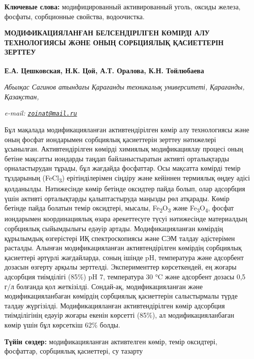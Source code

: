 {\bfseries Ключевые слова:} модифицированный активированный уголь, оксиды
железа, фосфаты, сорбционные свойства, водоочистка.

\begin{articleheader}
{\bfseries МОДИФИКАЦИЯЛАНҒАН БЕЛСЕНДІРІЛГЕН КӨМІРДІ АЛУ ТЕХНОЛОГИЯСЫ ЖӘНЕ
ОНЫҢ СОРБЦИЯЛЫҚ ҚАСИЕТТЕРІН ЗЕРТТЕУ}

{\bfseries
Е.А. Цешковская,
Н.К. Цой\textsuperscript{\envelope },
А.Т. Оралова,
К.Н. Тойлюбаева}
\end{articleheader}

\begin{affiliation}
\emph{Абылқас Сагинов атындағы Қарағанды техникалық университеті, Қарағанды, Қазақстан,}

\emph{e-mail: \href{mailto:zoinat@mail.ru}{\nolinkurl{zoinat@mail.ru}}}
\end{affiliation}

Бұл мақалада модификацияланған активтендірілген көмір алу технологиясы
және оның фосфат иондарымен сорбциялық қасиеттерін зерттеу нәтижелері
ұсынылған. Активтендірілген көмірді химиялық модификациялау процесі оның
бетіне мақсатты иондарды таңдап байланыстыратын активті орталықтарды
орналастырудан тұрады, бұл жағдайда фосфаттар. Осы мақсатта көмірді
темір тұздарының (FeCl\textsubscript{3}) ерітінділерімен сіңдіру және
кейіннен термиялық өңдеу әдісі қолданылды. Нәтижесінде көмір бетінде
оксидтер пайда болып, олар адсорбция үшін активті орталықтарды
қалыптастыруда маңызды рөл атқарады. Көмір бетінде пайда болатын темір
оксидтері, мысалы, Fe\textsubscript{2}O\textsubscript{3} және
Fe\textsubscript{3}O\textsubscript{4}, фосфат иондарымен координациялық
өзара әрекеттесуге түсуі нәтижесінде материалдың сорбциялық сыйымдылығы
едәуір артады. Модификацияланған көмірдің құрылымдық өзгерістері ИҚ
спектроскопиясы және СЭМ талдау әдістерімен расталды. Алынған
модификацияланған активтендірілген көмірдің сорбциялық қасиеттері
әртүрлі жағдайларда, соның ішінде pH, температура және адсорбент дозасын
өзгерту арқылы зерттелді. Эксперименттер көрсеткендей, ең жоғары
адсорбция тиімділігі (85\%) pH 7, температура 30 °C және адсорбент
дозасы 0,5 г/л болғанда қол жеткізілді. Сондай-ақ, модификацияланған
және модификацияланбаған көмірдің сорбциялық қасиеттерін салыстырмалы
түрде талдау жүргізілді. Модификацияланған активтендірілген көмір
адсорбция тиімділігінің едәуір жоғары екенін көрсетті (85\%), ал
модификацияланбаған көмір үшін бұл көрсеткіш 62\% болды.

{\bfseries Түйін сөздер:} модификацияланған активтелген көмір, темір
оксидтері, фосфаттар, сорбциялық қасиеттері, су тазарту

